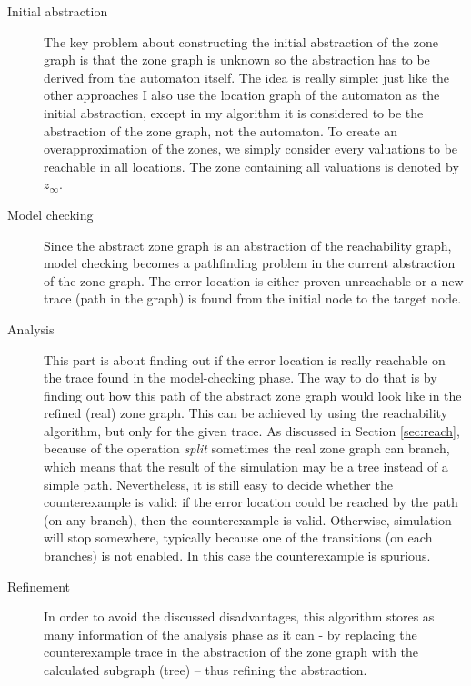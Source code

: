  \begin{description}
 	\item[Initial abstraction] The key problem about constructing the initial abstraction of the zone graph is that the zone graph is unknown so the abstraction has to be derived from the automaton itself. The idea is really simple: just like the other approaches I also use the location graph of the automaton as the initial abstraction, except in my algorithm it is considered to be the abstraction of the zone graph, not the automaton. To create an overapproximation of the zones, we simply consider every valuations to be reachable in all locations. The zone containing all valuations is denoted by $z_\infty$.
 	\item[Model checking] Since the abstract zone graph is an abstraction of the reachability graph, model checking becomes a pathfinding problem in the current abstraction of the zone graph. The error location is either proven unreachable or a new trace (path in the graph) is found from the initial node to the target node.
 	\item[Analysis] This part is about finding out if the error location is really reachable on the trace found in the model-checking phase. The way to do that is by finding out how this path of the abstract zone graph would look like in the refined (real) zone graph. This can be achieved by using the reachability algorithm, but only for the given trace. As discussed in Section \ref{sec:reach}, because of the operation \emph{split} sometimes the real zone graph can branch, which means that the result of the simulation may be a tree instead of a simple path. Nevertheless, it is still easy to decide whether the counterexample is valid: if the error location could be reached by the path (on any branch), then the counterexample is valid. Otherwise, simulation will stop somewhere, typically because one of the transitions (on each branches) is not enabled. In this case the counterexample is spurious.
 	\item[Refinement] In order to avoid the discussed disadvantages, this algorithm stores as many information of the analysis phase as it can - by replacing the counterexample trace in the abstraction of the zone graph with the calculated subgraph (tree) -- thus refining the abstraction.
 \end{description}


